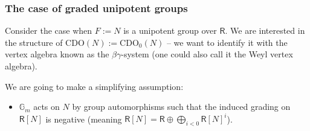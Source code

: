 \documentclass{amsart}
\theoremstyle{definition}
\newcommand{\Ring}{\mathsf{R}}
\newcommand{\CDO}{\mathrm{CDO}}
\numberwithin{equation}{section}
\begin{document}






\subsubsection{The case of graded unipotent groups}
Consider the case when $F:=N$ is a unipotent group over $\Ring$. We are interested in the structure of $\CDO(N):=\CDO_0(N)$ -- we want to identify it with the vertex algebra known as the $\beta\gamma$-system (one could also call it the Weyl vertex algebra).

We are going to make a simplifying assumption:
\begin{itemize}
\item[(*)] $\mathbb{G}_m$ acts on $N$ by group automorphisms such that the induced grading on $\Ring[N]$ is negative (meaning $\Ring[N]=\Ring\oplus \bigoplus_{i<0}\Ring[N]^i$).
\end{itemize}
\end{document}

